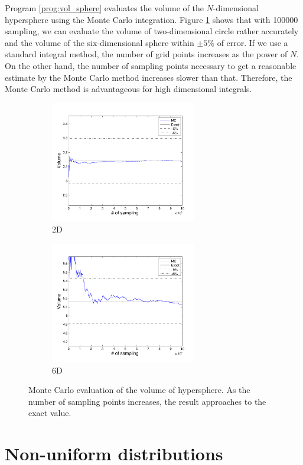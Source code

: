 \begin{example}
Program \ref{prog:vol_sphere} evaluates the volume of the $N$-dimensional hypersphere using the Monte Carlo integration. Figure \ref{fig:MC_hypersphere} shows that with 100000 sampling,
we can evaluate the volume of two-dimensional circle rather accurately and the volume of the six-dimensional sphere within $\pm 5\%$ of error.
If we use a standard integral method, the number of grid points increases as the power of $N$. On the other hand, the number of sampling points necessary to get a reasonable estimate by the Monte Carlo method increases slower than that.  Therefore, the Monte Carlo method is advantageous for high dimensional integrals.

\begin{figure}
\centering
	\begin{subfigure}{0.45\textwidth}
		\centering
		\includegraphics[width=2.5in]{15.Random-Numbers/v2.pdf}
		\caption{2D}
	\end{subfigure}
	\begin{subfigure}{0.45\textwidth}
		\centering
		\includegraphics[width=2.5in]{15.Random-Numbers/v6.pdf}
		\caption{6D}
	\end{subfigure}
\caption{Monte Carlo evaluation of the volume of hypersphere. As the number of sampling points increases, the result approaches to the exact value.}
\label{fig:MC_hypersphere}
\end{figure}
\end{example}

\noindent
\section{Non-uniform distributions}

